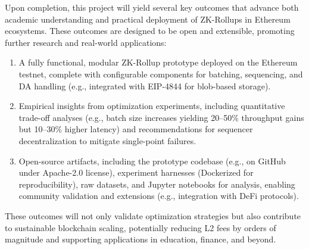 Upon completion, this project will yield several key outcomes that advance both academic understanding and practical deployment of ZK-Rollups in Ethereum ecosystems. These outcomes are designed to be open and extensible, promoting further research and real-world applications:
\begin{enumerate}
    \item A fully functional, modular ZK-Rollup prototype deployed on the Ethereum testnet, complete with configurable components for batching, sequencing, and DA handling (e.g., integrated with EIP-4844 for blob-based storage).
    \item Empirical insights from optimization experiments, including quantitative trade-off analyses (e.g., batch size increases yielding 20--50\% throughput gains but 10--30\% higher latency) and recommendations for sequencer decentralization to mitigate single-point failures.
    \item Open-source artifacts, including the prototype codebase (e.g., on GitHub under Apache-2.0 license), experiment harnesses (Dockerized for reproducibility), raw datasets, and Jupyter notebooks for analysis, enabling community validation and extensions (e.g., integration with DeFi protocols).
\end{enumerate}
These outcomes will not only validate optimization strategies but also contribute to sustainable blockchain scaling, potentially reducing L2 fees by orders of magnitude and supporting applications in education, finance, and beyond.